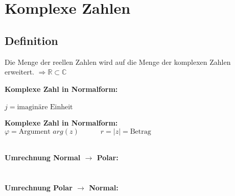 \section{Komplexe Zahlen}
\subsection{Definition}
	Die Menge der reellen Zahlen wird auf die Menge der komplexen Zahlen erweitert. $\Rightarrow \mathbb{R} \subset \mathbb{C}$\\
	
	\begin{minipage}[t]{0.5\textwidth}
		\textbf{Komplexe Zahl in Normalform:}\\[3pt]
		\\
		$j = \text{imaginäre Einheit}$
	\end{minipage}
	\begin{minipage}[t]{0.5\textwidth}
		\textbf{Komplexe Zahl in Normalform:}\\[3pt]
		$\varphi = \text{Argument } arg(z) \quad\qquad r = \left| z \right| = \text{Betrag}$
	\end{minipage}\\[3pt]
	\textbf{Umrechnung Normal $\rightarrow$ Polar:}\\
	\\[3pt]
	\scalebox{1}{}\\[3pt]
	\textbf{Umrechnung Polar $\rightarrow$ Normal:}\\[3pt]
	\\[3pt]
